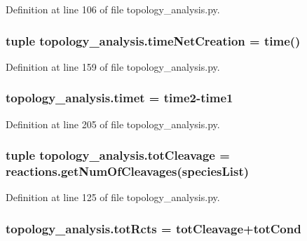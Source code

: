 Definition at line 106 of file topology\-\_\-analysis.\-py.

\hypertarget{a00157_a2f85d448268dd44ad47f66b65bfa45b6}{
\subsubsection[{time\-Net\-Creation}]{\setlength{\rightskip}{0pt plus 5cm}tuple topology\-\_\-analysis.\-time\-Net\-Creation = time()}}\label{a00157_a2f85d448268dd44ad47f66b65bfa45b6}


Definition at line 159 of file topology\-\_\-analysis.\-py.

\hypertarget{a00157_a5b12bbbc66679be171ab082dbaeba90b}{
\subsubsection[{timet}]{\setlength{\rightskip}{0pt plus 5cm}topology\-\_\-analysis.\-timet = {\bf time2}-\/{\bf time1}}}\label{a00157_a5b12bbbc66679be171ab082dbaeba90b}


Definition at line 205 of file topology\-\_\-analysis.\-py.

\hypertarget{a00157_a1e875e49e1f980d461a398fd6a072b0b}{
\subsubsection[{tot\-Cleavage}]{\setlength{\rightskip}{0pt plus 5cm}tuple topology\-\_\-analysis.\-tot\-Cleavage = reactions.\-get\-Num\-Of\-Cleavages({\bf species\-List})}}\label{a00157_a1e875e49e1f980d461a398fd6a072b0b}


Definition at line 125 of file topology\-\_\-analysis.\-py.

\hypertarget{a00157_a059c41eb160321f87ba469fddd20eda7}{
\subsubsection[{tot\-Rcts}]{\setlength{\rightskip}{0pt plus 5cm}topology\-\_\-analysis.\-tot\-Rcts = {\bf tot\-Cleavage}+tot\-Cond}}\label{a00157_a059c41eb160321f87ba469fddd20eda7}


